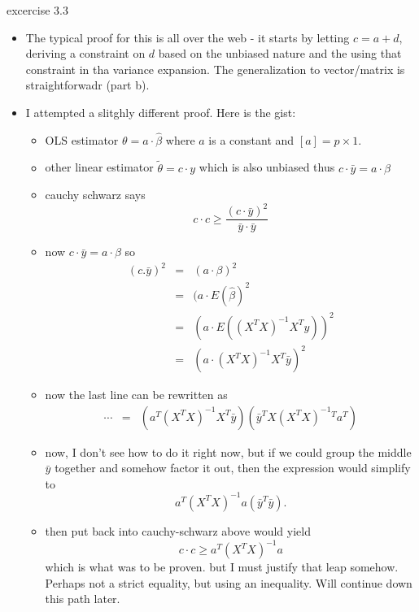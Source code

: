 \documentclass[a4paper]{report}
\newcommand{\<}{\textless}
\newcommand{\yb}{\bar{y}}
\renewcommand{\>}{\textgreater}
\begin{document}
excercise 3.3
\begin{itemize}
  \item The typical proof for this is all over the web - it starts by letting $c = a + d$, deriving a constraint on $d$ based on the unbiased nature and the using that constraint in tha variance expansion. The generalization to vector/matrix is straightforwadr (part b).
  \item I attempted a slitghly different proof. Here is the gist:
  \begin{itemize}
    \item OLS estimator $\theta = a \cdot \hat{\beta}$ where $a$ is a constant and $[a] = p\times 1$.
    \item other linear estimator $\tilde{\theta} = c \cdot y$ which is also unbiased
      \subitem thus $c \cdot \bar{y} = a \cdot \beta$
    \item cauchy schwarz says
      $$ c\cdot c \geq \frac{(c \cdot \bar{y})^2}{\bar{y}\cdot \bar{y}} $$
    \item now $c\cdot\bar{y} = a \cdot \beta$ so 
      \begin{eqnarray}
	(c.\bar{y})^2 &=& (a \cdot \beta)^2 \\
			&=& (a \cdot E(\hat{\beta})^2 \\
			  &=& (a \cdot E\left((X^TX)^{-1}X^Ty\right))^2 \\
			  &=& (a \cdot (X^TX)^{-1}X^T\yb)^2 
      \end{eqnarray}
    \item now the last line can be rewritten as
      \begin{eqnarray}
	\cdots &=& (a^T(X^TX)^{-1}X^T\yb)(\yb^TX(X^TX)^{-1}{}^Ta^T)
      \end{eqnarray}
    \item now, I don't see how to do it right now, but if we could group the middle $\yb$ together and somehow factor it out, then the expression would simplify to 
      $$a^T(X^TX)^{-1}a(\yb^T\yb).$$
    \item then put back into cauchy-schwarz above would yield
      $$c\cdot c \geq a^T(X^TX)^{-1}a$$
      which is what was to be proven. but I must justify that leap somehow. Perhaps not a strict equality, but using an inequality. Will continue down this path later.
  \end{itemize}
\end{itemize}
\end{document}
